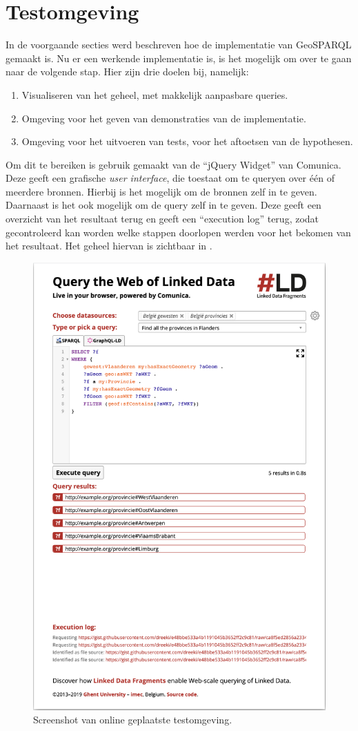 \section{Testomgeving}
\label{sec:testomgeving}
In de voorgaande secties werd beschreven hoe de implementatie van GeoSPARQL gemaakt is. Nu er een werkende implementatie is, is het mogelijk om over te gaan naar de volgende stap. Hier zijn drie doelen bij, namelijk:
\begin{enumerate}
    \item Visualiseren van het geheel, met makkelijk aanpasbare queries.
    \item Omgeving voor het geven van demonstraties van de implementatie.
    \item Omgeving voor het uitvoeren van tests, voor het aftoetsen van de hypothesen.
\end{enumerate}

Om dit te bereiken is gebruik gemaakt van de ``jQuery Widget'' van Comunica. Deze geeft een grafische \textit{user interface}, die toestaat om te queryen over één of meerdere bronnen. Hierbij is het mogelijk om de bronnen zelf in te geven. Daarnaast is het ook mogelijk om de query zelf in te geven. Deze geeft een overzicht van het resultaat terug en geeft een ``execution log'' terug, zodat gecontroleerd kan worden welke stappen doorlopen werden voor het bekomen van het resultaat. Het geheel hiervan is zichtbaar in .

\begin{figure}
    \centering
    \includegraphics[width=0.8\linewidth]{images/testomgeving.png}
    \caption{Screenshot van online geplaatste testomgeving.}
    \label{fig:testomgeving}
\end{figure}

